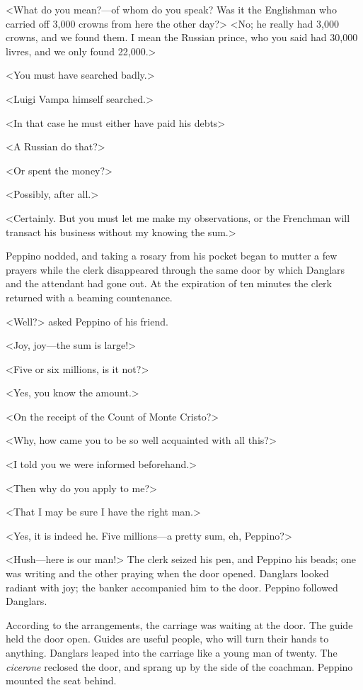  <What do you mean?—of whom do you speak? Was it the Englishman who carried off 3,000 crowns from here the other day?>  <No; he really had 3,000 crowns, and we found them. I mean the Russian prince, who you said had 30,000 livres, and we only found 22,000.> 

 <You must have searched badly.> 

 <Luigi Vampa himself searched.> 

 <In that case he must either have paid his debts\longdash> 

 <A Russian do that?> 

 <Or spent the money?> 

 <Possibly, after all.> 

 <Certainly. But you must let me make my observations, or the Frenchman will transact his business without my knowing the sum.> 

 Peppino nodded, and taking a rosary from his pocket began to mutter a few prayers while the clerk disappeared through the same door by which Danglars and the attendant had gone out. At the expiration of ten minutes the clerk returned with a beaming countenance. 

 <Well?> asked Peppino of his friend. 

 <Joy, joy—the sum is large!> 

 <Five or six millions, is it not?> 

 <Yes, you know the amount.> 

 <On the receipt of the Count of Monte Cristo?> 

 <Why, how came you to be so well acquainted with all this?> 

 <I told you we were informed beforehand.> 

 <Then why do you apply to me?> 

 <That I may be sure I have the right man.> 

 <Yes, it is indeed he. Five millions—a pretty sum, eh, Peppino?> 

 <Hush—here is our man!> The clerk seized his pen, and Peppino his beads; one was writing and the other praying when the door opened. Danglars looked radiant with joy; the banker accompanied him to the door. Peppino followed Danglars. 

 According to the arrangements, the carriage was waiting at the door. The guide held the door open. Guides are useful people, who will turn their hands to anything. Danglars leaped into the carriage like a young man of twenty. The \textit{cicerone} reclosed the door, and sprang up by the side of the coachman. Peppino mounted the seat behind. 

